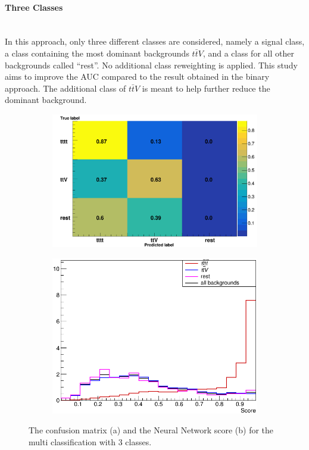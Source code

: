 \newpage

\paragraph{Three Classes} \mbox{} \\

In this approach, only three different classes are considered, namely a signal class, a class containing the most dominant backgrounds $t\bar{t}V$, and a class for all other backgrounds called ``rest''. No additional class reweighting is applied. This study aims to improve the AUC compared to the result obtained in the binary approach. The additional class of $t\bar{t}V$ is meant to help further reduce the dominant background.

\begin{figure}[H]
\begin{subfigure}{.55\textwidth}
  \centering
  \includegraphics[width=.99\linewidth]{figs/MultiClass/CmOther}
  \caption{}
  \label{fig:CM3}
\end{subfigure}%
\begin{subfigure}{.45\textwidth}
  \centering
  \includegraphics[width=.99\linewidth]{figs/MultiClass/ScoreFNN14Even_0}
  \caption{}
  \label{fig:Score3}
\end{subfigure}
\caption{The confusion matrix (a) and the Neural Network score (b) for the multi classification with 3 classes.}
\label{fig:3Class}
\end{figure}

